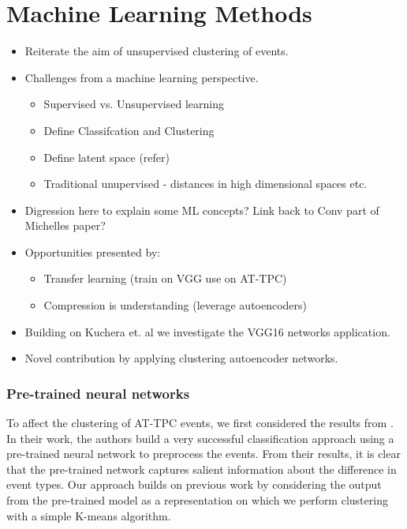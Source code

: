\documentclass[preprint,12pt]{elsarticle}
\begin{document}
\section{Machine Learning Methods}

\begin{itemize}
    \item Reiterate the aim of unsupervised  clustering of events.
    \item Challenges from a machine learning perspective. 
    \begin{itemize}
        \item Supervised vs. Unsupervised learning
        \item Define Classifcation and Clustering 
        \item Define latent space (refer)
        \item Traditional unupervised - distances in high dimensional spaces etc. 
    \end{itemize}
    \item Digression here to explain some ML concepts? Link back to Conv part of Michelles paper? 
    \item Opportunities presented by: 
    \begin{itemize}
        \item Transfer learning (train on VGG use on AT-TPC)
        \item Compression is understanding (leverage autoencoders) 
    \end{itemize}
    \item Building on Kuchera et. al we investigate the VGG16 networks application. 
    \item Novel contribution by applying clustering autoencoder networks. 
\end{itemize}

\subsubsection{Pre-trained neural networks}

To affect the clustering of AT-TPC events, we first considered the results from \citet{Kuchera2019}. In their work, the authors build a very successful classification approach using a pre-trained neural network to preprocess the events. From their results, it is clear that the pre-trained network captures salient information about the difference in event types. Our approach builds on previous work by considering the output from the pre-trained model as a representation on which we perform clustering with a simple K-means algorithm. 
\end{document}
